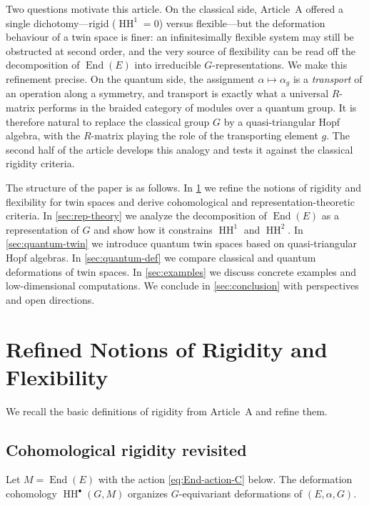 \documentclass[11pt,a4paper]{article}
\numberwithin{equation}{section}
\DeclareMathOperator{\End}{End}
\DeclareMathOperator{\HH}{HH}
\newcommand{\TwinSpace}{(E,\alpha,G)}
\begin{document}
	Two questions motivate this article. On the classical side, Article~A offered a single dichotomy---rigid
	($\HH^1=0$) versus flexible---but the deformation behaviour of a twin space is finer: an infinitesimally
	flexible system may still be obstructed at second order, and the very source of flexibility can be read off
	the decomposition of $\End(E)$ into irreducible $G$-representations. We make this refinement precise. On the
	quantum side, the assignment $\alpha\mapsto\alpha_g$ is a \emph{transport} of an operation along a symmetry,
	and transport is exactly what a universal $R$-matrix performs in the braided category of modules over a
	quantum group. It is therefore natural to replace the classical group $G$ by a quasi-triangular Hopf algebra,
	with the $R$-matrix playing the role of the transporting element $g$. The second half of the article develops
	this analogy and tests it against the classical rigidity criteria.

	The structure of the paper is as follows.
	In \cref{sec:rigid-flex} we refine the notions of rigidity and flexibility for twin spaces
	and derive cohomological and representation-theoretic criteria.
	In \cref{sec:rep-theory} we analyze the decomposition of $\End(E)$ as a representation of $G$
	and show how it constrains $\HH^1$ and $\HH^2$.
	In \cref{sec:quantum-twin} we introduce quantum twin spaces based on quasi-triangular Hopf algebras.
	In \cref{sec:quantum-def} we compare classical and quantum deformations of twin spaces.
	In \cref{sec:examples} we discuss concrete examples and low-dimensional computations.
	We conclude in \cref{sec:conclusion} with perspectives and open directions.
	
	\section{Refined Notions of Rigidity and Flexibility}
	\label{sec:rigid-flex}
	
	We recall the basic definitions of rigidity from Article~A and refine them.
	
	\subsection{Cohomological rigidity revisited}
	
	Let $M=\End(E)$ with the action \eqref{eq:End-action-C} below.
	The deformation cohomology $\HH^\bullet(G,M)$ organizes $G$-equivariant deformations of $\TwinSpace$.
	
\end{document}
